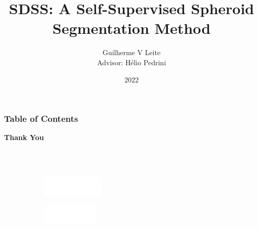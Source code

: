 \documentclass[aspectratio=169,t,xcolor=table]{beamer}
\begin{document}
\title[Inf UFG]{SDSS: A Self-Supervised Spheroid Segmentation
Method}

\author{Guilherme V Leite\\ \bigskip Advisor: Hélio Pedrini}

\date{2022}
\frame[noframenumbering]{\titlepage}



\begin{frame}
    \frametitle{Table of Contents}
    \tableofcontents
\end{frame}









\begin{frame}
    
    \centering
    \vspace{2cm}
    
    \textbf{\Huge Thank You}
    
    \ \\
    
    \textbf{}
    \ \\
    
    
    \vspace{2cm}
    \begin{figure}
        \centering
        \begin{subfigure}{0.2\textwidth}
            \centering
            \includegraphics[height=1cm]{lib/logos/infw.png}
        \end{subfigure}%
        \qquad 
        \begin{subfigure}{0.2\textwidth}
            \centering
            \includegraphics[height=1cm]{lib/logos/ufgw.png}
        \end{subfigure}
      
    \end{figure}
    
\end{frame}
\titlepage
\end{document}
